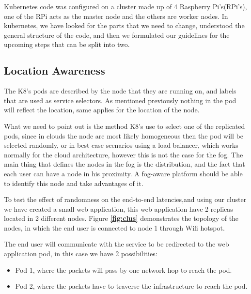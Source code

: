 \documentclass[letterpaper,twocolumn,10pt]{article}
\let\origref\ref
\def\ref#1{\textbf{\origref{#1}}}
\begin{document}
Kubernetes code was configured on a cluster made up of 4 Raspberry Pi's(RPi's), one of the RPi acts as the master node and the others are worker nodes. In kubernetes, we have looked for the parts that we need to change, understood the general structure of the code, and then we formulated our guidelines for the upcoming steps that can be split into two. 
 
\subsection{Location Awareness}

The K8's pods are described by the node that they are running on, and labels that are used as service selectors. As mentioned previously nothing in the pod will reflect the location, same applies for the location of the node. 

What we need to point out is the method K8's use to select one of the replicated pods, since in clouds the node are most likely homogeneous then the pod will be selected randomly, or in best case scenarios using a load balancer, which works normally for the cloud architecture, however this is not the case for the fog. The main thing that defines the nodes in the fog is the distribution, and the fact that each user can have a node in his proximity. A fog-aware platform should be able to identify this node and take advantages of it. 

To test the effect of randomness on the end-to-end latencies,and using our cluster we have created a small web application, this web application have 2 replicas located in 2 different nodes. Figure \ref{fig:clus} demonstrates the topology of the nodes, in which the end user is connected to node 1 through Wifi hotspot.

The end user will communicate with the service to be redirected to the web application pod, in this case we have 2 possibilities: 
\begin{itemize}
\item Pod 1, where the packets will pass by one network hop to reach the pod. 
\item Pod 2, where the packets have to traverse the infrastructure to reach the pod.
\end{itemize}
 
\end{document}
